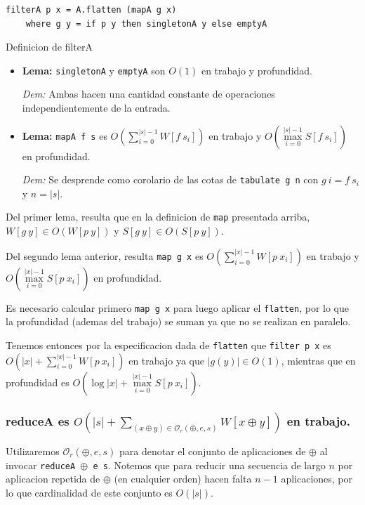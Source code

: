 \documentclass[12pt]{article}
\begin{document}
\begin{table}[h]
\begin{lstlisting}
filterA p x = A.flatten (mapA g x)
    where g y = if p y then singletonA y else emptyA
\end{lstlisting}
\caption{Definicion de filterA}
\end{table}
\begin{itemize}
\item \textbf{Lema:} \texttt{singletonA} y \texttt{emptyA} son $O(1)$ en trabajo y profundidad.

 \textit{Dem:} Ambas hacen una cantidad constante de operaciones independientemente de la entrada.
 
\item \textbf{Lema:} \texttt{mapA f s} es $O( \sum\limits_{i=0}^{|s|-1} W[f\ s_i] )$ en trabajo y $O( \max\limits_{i=0}^{|s|-1} S[f\ s_i] )$ en profundidad.

 \textit{Dem:} Se desprende como corolario de las cotas de \texttt{tabulate g n} con $g\ i = f\ s_i$ y $n=|s|$. 
 
\end{itemize}

Del primer lema, resulta que en la definicion de \texttt{map} presentada arriba,  $W[g\ y]\in O(W[p\ y])$ y $S[g\ y]\in O(S[p\ y])$.

Del segundo lema anterior, resulta \texttt{map\ g\ x} es $O(\sum\limits_{i=0}^{|x|-1} W[p\ x_i])$ en trabajo y $O(\max\limits_{i=0}^{|x|-1} S[p\ x_i])$ en profundidad.

Es necesario calcular primero \texttt{map\ g\ x} para luego aplicar el \texttt{flatten}, por lo que la profundidad (ademas del trabajo) se suman ya que no se realizan en paralelo.

Tenemos entonces por la especificacion dada de \texttt{flatten} que \texttt{filter\ p\ x} es $O(|x| + \sum\limits_{i=0}^{|x|-1} W[p\ x_i])$ en trabajo ya que $|g(y)| \in O(1)$, mientras que en profundidad es $O(\log |x| + \max\limits_{i=0}^{|x|-1} S[p\ x_i])$.


\subsubsection{reduceA es $O(|s| + \sum\limits_{(x\oplus y)\in\mathcal{O}_r(\oplus,e,s)} W[x\oplus y])$ en trabajo.}

Utilizaremos $\mathcal{O}_r(\oplus,e,s)$ para denotar el conjunto de aplicaciones de $\oplus$ al invocar \texttt{reduceA $\oplus$ e s}. Notemos que para reducir una secuencia de largo $n$ por aplicacion repetida de $\oplus$ (en cualquier orden) hacen falta $n-1$ aplicaciones, por lo que cardinalidad de este conjunto es $O(|s|)$.
\end{document}
